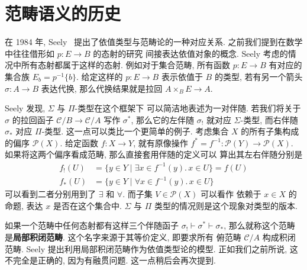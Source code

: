 \begin{center}
\end{center}



\section{范畴语义的历史} 

在 1984 年, Seely~\cite{seely:1984:lccc} 提出了依值类型与范畴论的一种对应关系.
之前我们提到在数学中往往借形如 \(p : E \to B\) 的态射的研究
间接表达依值对象的概念.
Seely 考虑的情况中所有态射都属于这样的态射.
例如对于集合范畴, 所有函数 \(p : E \to B\) 有对应的
集合族 \(E_b = p^{-1} \{b\}\).
给定这样的 \(p : E \to B\) 表示依值于 \(B\) 的类型,
若有另一个箭头 \(\sigma : A \to B\) 表达代换,
那么代换结果就是拉回 \(A \times_B E \to A\).

Seely 发现, \(\Sigma\) 与 \(\Pi\)-类型在这个框架下
可以简洁地表述为一对伴随.
若我们将关于 \(\sigma\) 的拉回函子
\(\mathcal{C}/B \to \mathcal{C}/A\)
写作 \(\sigma^*\),
那么它的左伴随 \(\sigma_!\) 就对应 \(\Sigma\)-类型,
而右伴随 \(\sigma_*\) 对应 \(\Pi\)-类型.
这一点可以类比一个更简单的例子.
考虑集合 \(X\) 的所有子集构成的偏序 \(\mathcal{P}(X)\).
给定函数 \(f : X \to Y\), 就有原像操作
\(f^* = f^{-1} : \mathcal{P}(Y) \to \mathcal{P}(X)\).
如果将这两个偏序看成范畴, 那么直接套用伴随的定义可以
算出其左右伴随分别是
\[\begin{aligned}
f_! (U) &= \{y \in Y \mid \exists x \in f^{-1}(y).\,x \in U\} = f(U) \\
f_* (U) &= \{y \in Y \mid \forall x \in f^{-1}(y).\,x \in U\}
\end{aligned}\]
可以看到二者分别用到了 \(\exists\) 和 \(\forall\).
而子集 \(V \in \mathcal{P}(X)\) 可以看作
依赖于 \(x \in X\) 的命题, 表达 \(x\) 是否在这个集合中.
\(\Sigma\) 与 \(\Pi\) 类型的情况则是这个现象对类型的版本.

如果一个范畴中任何态射都有这样三个伴随函子
\(\sigma_! \vdash \sigma^* \vdash \sigma_*\),
那么就称这个范畴是\textbf{局部积闭范畴}.
这个名字来源于其等价定义, 即要求所有
俯范畴 \(\mathcal{C}/A\) 构成积闭范畴.
Seely 提出利用局部积闭范畴作为依值类型论的模型.
正如我们之前所说, 这不完全是正确的, 因为有融贯问题.
这一点稍后会再次提到.

